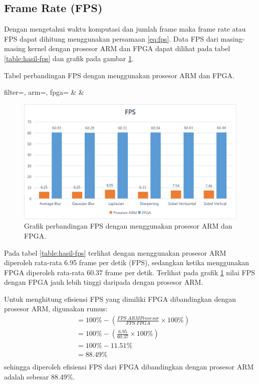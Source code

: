 \subsection{Frame Rate (FPS)}
Dengan mengetahui waktu komputasi dan jumlah frame maka frame rate atau FPS dapat dihitung menggunakan persamaan \ref{eq:fps}. Data FPS dari masing-masing kernel dengan prosesor ARM dan FPGA dapat dilihat pada tabel \ref{table:hasil-fps} dan grafik pada gambar \ref{fig:chart-fps}.
\begin{atable}
    \caption{Tabel perbandingan FPS dengan menggunakan prosesor ARM dan FPGA.}
    \label{table:hasil-fps}
        {
            filter=\filter, 
            arm=\arm, 
            fpga=\fpga}
        {
            \filter & 
            \arm & 
            \fpga }
\end{atable}
\begin{figure}[H]
    \includegraphics[width=0.81\linewidth, center]{images/chart/chart-fps.png}
    \caption{Grafik perbandingan FPS dengan menggunakan prosesor ARM dan FPGA.}
    \label{fig:chart-fps}
\end{figure}

Pada tabel \ref{table:hasil-fps} terlihat dengan menggunakan prosesor ARM diperoleh rata-rata 6.95 frame per detik (FPS), sedangkan ketika menggunakan FPGA diperoleh rata-rata 60.37 frame per detik. Terlihat pada grafik \ref{fig:chart-fps} nilai FPS dengan FPGA jauh lebih tinggi daripada dengan prosesor ARM.

Untuk menghitung efisiensi FPS yang dimiliki FPGA dibandingkan dengan prosesor ARM, digunakan rumus:
\begin{equation*}
    \begin{split}
& = 100\% - \left( \frac{FPS\ ARM Prosesor}{FPS\ FPGA} \times 100\% \right) \\
& = 100\% - \left( \frac{6.95}{60.37} \times 100\% \right) \\
& = 100\% - 11.51\% \\
& = 88.49\% \\
    \end{split}
\end{equation*}
sehingga diperoleh efisiensi FPS dari FPGA dibandingkan dengan prosesor ARM adalah sebesar 88.49\%.

